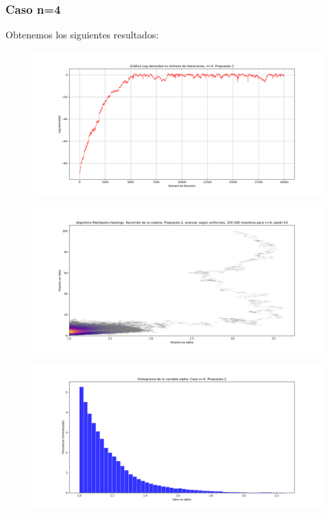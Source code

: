 \documentclass[letterpaper]{article}
\newcommand{\1}{\mathds{1}}
\theoremstyle{definition}
\theoremstyle{definition}
\theoremstyle{definition}
\theoremstyle{definition}
\theoremstyle{definition}
\begin{document}
\subsubsection*{Caso n=4}
Obtenemos los siguientes resultados:
\begin{figure}[h!]
    \centering
    \includegraphics[width=\linewidth]{9.png}
    \caption{}
\end{figure} 
\begin{figure}[h!]
    \centering
    \includegraphics[width=\linewidth]{10.png}
    \caption{}
\end{figure} 
\begin{figure}[h!]
    \centering
    \includegraphics[width=\linewidth]{11.png}
    \caption{}
\end{figure} 
\end{document}
